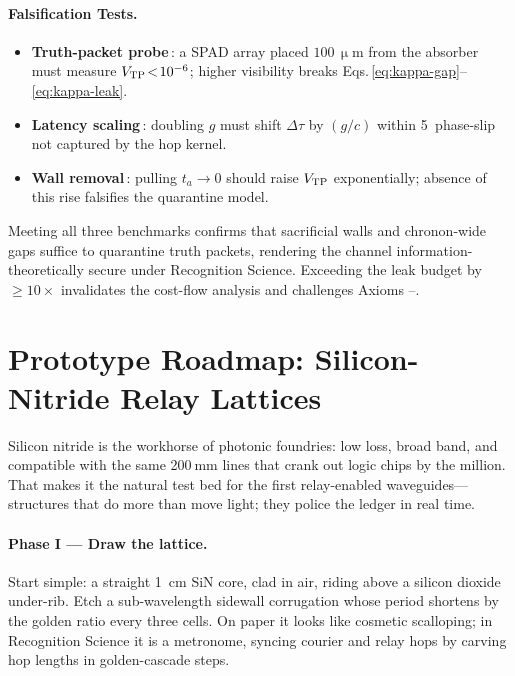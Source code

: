 \documentclass[11pt,oneside]{book}
\begin{document}
{\paragraph{Falsification Tests.}
\begin{itemize}\setlength\itemsep{3pt}
\item \textbf{Truth-packet probe}\,:  a SPAD array placed $100\,\upmu$m
      from the absorber must measure
      $V_{\rm TP}\!<\!10^{-6}$; higher visibility breaks
      Eqs.\,\eqref{eq:kappa-gap}–\eqref{eq:kappa-leak}.
\item \textbf{Latency scaling}\,:  doubling $g$ must shift $\Delta\tau$
      by $(g/c)$ within 5 %
      phase-slip not captured by the hop kernel.
\item \textbf{Wall removal}\,:  pulling $t_{a}\to0$ should raise
      $V_{\rm TP}$ exponentially; absence of this rise falsifies the
      quarantine model.
\end{itemize}

Meeting all three benchmarks confirms that sacrificial walls and
chronon-wide gaps suffice to quarantine truth packets, rendering the
channel information-theoretically secure under Recognition Science.
Exceeding the leak budget by \(\geq10\times\) invalidates the cost-flow
analysis and challenges Axioms –.

\section{Prototype Roadmap: Silicon-Nitride Relay Lattices}
\label{sec:sin-lattice-narrative}

Silicon nitride is the workhorse of photonic foundries: low loss,
broad band, and compatible with the same 200 mm lines that crank out
logic chips by the million.  
That makes it the natural test bed for the first relay-enabled
wave­guides—structures that do more than move light; they police the
ledger in real time.

\paragraph*{Phase I — Draw the lattice.}
Start simple: a straight \SI{1}{\centi\metre} SiN core, clad in
air, riding above a silicon dioxide under-rib.  
Etch a sub-wavelength sidewall corrugation whose period shortens by
the golden ratio every three cells.  
On paper it looks like cosmetic scalloping; in Recognition Science it
is a metronome, syncing courier and relay hops by carving hop lengths
in golden-cascade steps.

}
\end{document}
